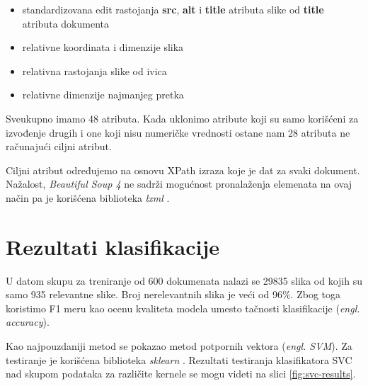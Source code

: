 \documentclass[a4paper]{article}
\begin{document}
\begin{itemize}
	\item standardizovana edit rastojanja \textbf{src}, \textbf{alt} i \textbf{title} atributa slike od \textbf{title} atributa dokumenta
	\item relativne koordinata i dimenzije slika
	\item relativna rastojanja slike od ivica
	\item relativne dimenzije najmanjeg pretka
\end{itemize}
Sveukupno imamo 48 atributa. Kada uklonimo atribute koji su samo korišćeni za izvođenje drugih i one koji nisu numeričke vrednosti ostane nam 28 atributa ne računajući ciljni atribut.

Ciljni atribut određujemo na osnovu XPath izraza koje je dat za svaki dokument. Nažalost, \textit{Beautiful Soup 4} ne sadrži mogućnost pronalaženja elemenata na ovaj način pa je korišćena biblioteka \textit{lxml} \cite{lxml}.

\section{Rezultati klasifikacije}

U datom skupu za treniranje od 600 dokumenata nalazi se 29835 slika od kojih su samo 935 relevantne slike. Broj nerelevantnih slika je veći od 96\%. Zbog toga koristimo F1 meru kao ocenu kvaliteta modela umesto tačnosti klasifikacije (\emph{engl. accuracy}).

Kao najpouzdaniji metod se pokazao metod potpornih vektora (\emph{engl. SVM}). Za testiranje je korišćena biblioteka \textit{sklearn} \cite{sklearn}. Rezultati testiranja klasifikatora SVC nad skupom podataka za različite kernele se mogu videti na slici \ref{fig:svc-results}.

%
\end{document}
